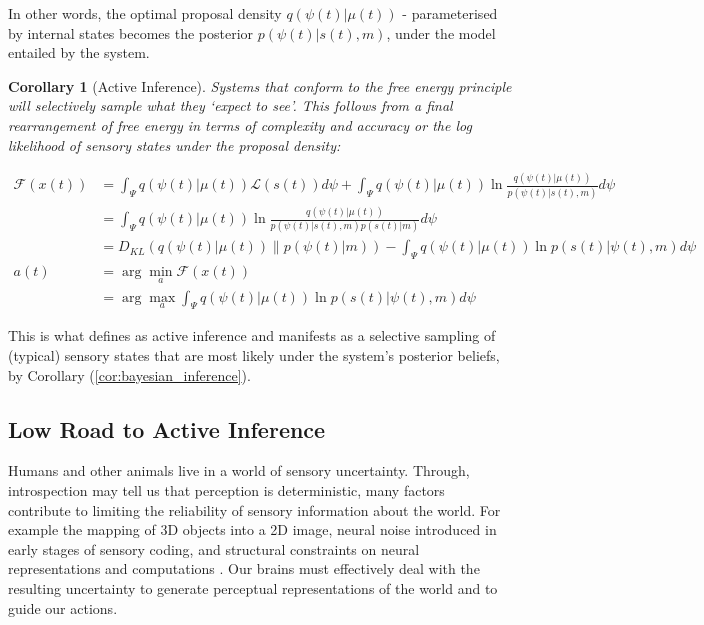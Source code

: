 \documentclass{article}
\newcommand{\refp}[1]{(\ref{#1})}
\newtheorem{corollary}{Corollary}
\begin{document}
In other words, the optimal proposal density $q(\psi(t) | \mu(t))$ - parameterised by internal states becomes the posterior $p(\psi(t) | s(t), m)$, under the model entailed by the system.

\begin{corollary}[Active Inference]
	Systems that conform to the free energy principle will selectively sample what they `expect to see'. This follows from a final rearrangement of free energy in terms of complexity and accuracy or the log likelihood of sensory states under the proposal density:
	
\begin{align*}
	\mathcal{F}(x(t)) & =\int_{\Psi} q(\psi(t) | \mu(t)) \mathcal{L}(s(t)) d \psi+\int_{\Psi} q(\psi(t) | \mu(t)) \ln \frac{q(\psi(t) | \mu(t))}{p(\psi(t) | s(t), m)} d \psi \\
		& =\int_{\Psi} q(\psi(t) | \mu(t)) \ln \frac{q(\psi(t) | \mu(t))}{p(\psi(t) | s(t), m) p(s(t) | m)} d \psi \\
		& =D_{K L}(q(\psi(t) | \mu(t)) \| p(\psi(t) | m))-\int_{\Psi} q(\psi(t) | \mu(t)) \ln p(s(t) | \psi(t), m) d \psi \\
		a(t) & =\arg \min _a \mathcal{F}(x(t)) \\
		& =\arg \max _a \int_{\Psi} q(\psi(t) | \mu(t)) \ln p(s(t) | \psi(t), m) d \psi
\end{align*}

\end{corollary}


This is what \citet{friston2012active} defines as active inference and manifests as a selective sampling of (typical) sensory states that are most likely under the system's posterior beliefs, by Corollary \refp{cor:bayesian_inference}.

\subsection{Low Road to Active Inference}

Humans and other animals live in a world of sensory uncertainty. Through, introspection may tell us that perception is deterministic, many factors contribute to limiting the reliability of sensory information about the world. For example the mapping of 3D objects into a 2D image, neural noise introduced in early stages of sensory coding, and structural constraints on neural representations and computations \citep{knill2004bayesian}. Our brains must effectively deal with the resulting uncertainty to generate perceptual representations of the world and to guide our actions.
\end{document}
